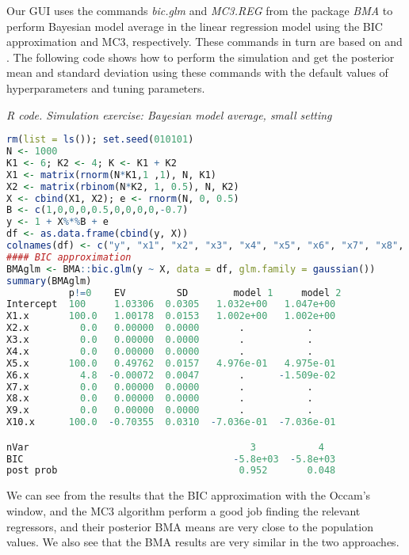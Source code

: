 Our GUI uses the commands \textit{bic.glm} and \textit{MC3.REG} from the package \textit{BMA} to perform Bayesian model average in the linear regression model using the BIC approximation and MC3, respectively. These commands in turn are based on \cite{Raftery1995} and \cite{Raftery1997}. The following code shows how to perform the simulation and get the posterior mean and standard deviation using these commands with the default values of hyperparameters and tuning parameters.

\begin{tcolorbox}[enhanced,width=4.67in,center upper,
	fontupper=\large\bfseries,drop shadow southwest,sharp corners]
	\textit{R code. Simulation exercise: Bayesian model average, small setting}
	\begin{VF}
		\begin{lstlisting}[language=R]
rm(list = ls()); set.seed(010101)
N <- 1000
K1 <- 6; K2 <- 4; K <- K1 + K2
X1 <- matrix(rnorm(N*K1,1 ,1), N, K1)
X2 <- matrix(rbinom(N*K2, 1, 0.5), N, K2)
X <- cbind(X1, X2); e <- rnorm(N, 0, 0.5)
B <- c(1,0,0,0,0.5,0,0,0,0,-0.7)
y <- 1 + X%*%B + e
df <- as.data.frame(cbind(y, X)) 
colnames(df) <- c("y", "x1", "x2", "x3", "x4", "x5", "x6", "x7", "x8", "x9", "x10")
#### BIC approximation
BMAglm <- BMA::bic.glm(y ~ X, data = df, glm.family = gaussian()) 
summary(BMAglm)
           p!=0    EV         SD        model 1     model 2   
Intercept  100     1.03306  0.0305   1.032e+00   1.047e+00
X1.x       100.0   1.00178  0.0153   1.002e+00   1.002e+00
X2.x         0.0   0.00000  0.0000       .           .    
X3.x         0.0   0.00000  0.0000       .           .    
X4.x         0.0   0.00000  0.0000       .           .    
X5.x       100.0   0.49762  0.0157   4.976e-01   4.975e-01
X6.x         4.8  -0.00072  0.0047       .      -1.509e-02
X7.x         0.0   0.00000  0.0000       .           .    
X8.x         0.0   0.00000  0.0000       .           .    
X9.x         0.0   0.00000  0.0000       .           .    
X10.x      100.0  -0.70355  0.0310  -7.036e-01  -7.036e-01

nVar                                       3           4      
BIC                                     -5.8e+03  -5.8e+03
post prob                                0.952       0.048
\end{lstlisting}
	\end{VF}
\end{tcolorbox} 

We can see from the results that the BIC approximation with the Occam's window, and the MC3 algorithm perform a good job finding the relevant regressors, and their posterior BMA means are very close to the population values. We also see that the BMA results are very similar in the two approaches.


